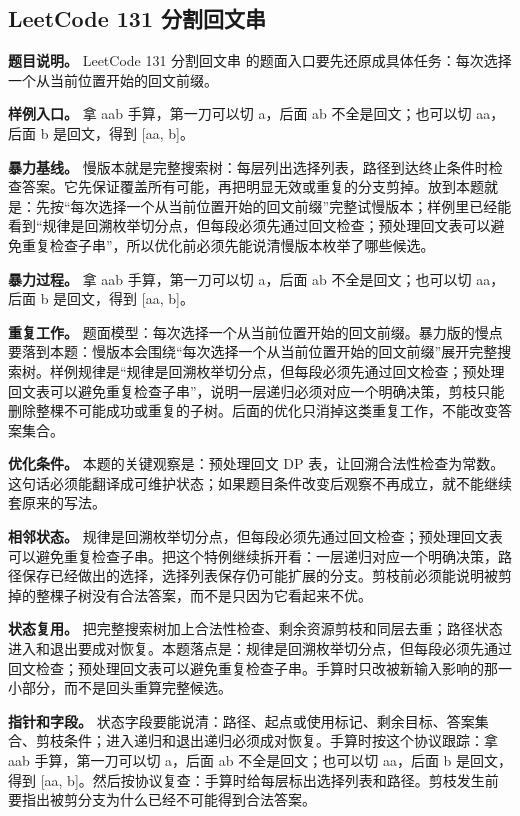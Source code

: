 \subsection{LeetCode 131 分割回文串}

\textbf{题目说明。} LeetCode 131 分割回文串 的题面入口要先还原成具体任务：每次选择一个从当前位置开始的回文前缀。

\textbf{样例入口。} 拿 aab 手算，第一刀可以切 a，后面 ab 不全是回文；也可以切 aa，后面 b 是回文，得到 [aa, b]。

\textbf{暴力基线。} 慢版本就是完整搜索树：每层列出选择列表，路径到达终止条件时检查答案。它先保证覆盖所有可能，再把明显无效或重复的分支剪掉。放到本题就是：先按“每次选择一个从当前位置开始的回文前缀”完整试慢版本；样例里已经能看到“规律是回溯枚举切分点，但每段必须先通过回文检查；预处理回文表可以避免重复检查子串”，所以优化前必须先能说清慢版本枚举了哪些候选。

\textbf{暴力过程。} 拿 aab 手算，第一刀可以切 a，后面 ab 不全是回文；也可以切 aa，后面 b 是回文，得到 [aa, b]。

\textbf{重复工作。} 题面模型：每次选择一个从当前位置开始的回文前缀。暴力版的慢点要落到本题：慢版本会围绕“每次选择一个从当前位置开始的回文前缀”展开完整搜索树。样例规律是“规律是回溯枚举切分点，但每段必须先通过回文检查；预处理回文表可以避免重复检查子串”，说明一层递归必须对应一个明确决策，剪枝只能删除整棵不可能成功或重复的子树。后面的优化只消掉这类重复工作，不能改变答案集合。

\textbf{优化条件。} 本题的关键观察是：预处理回文 DP 表，让回溯合法性检查为常数。这句话必须能翻译成可维护状态；如果题目条件改变后观察不再成立，就不能继续套原来的写法。

\textbf{相邻状态。} 规律是回溯枚举切分点，但每段必须先通过回文检查；预处理回文表可以避免重复检查子串。把这个特例继续拆开看：一层递归对应一个明确决策，路径保存已经做出的选择，选择列表保存仍可能扩展的分支。剪枝前必须能说明被剪掉的整棵子树没有合法答案，而不是只因为它看起来不优。

\textbf{状态复用。} 把完整搜索树加上合法性检查、剩余资源剪枝和同层去重；路径状态进入和退出要成对恢复。本题落点是：规律是回溯枚举切分点，但每段必须先通过回文检查；预处理回文表可以避免重复检查子串。手算时只改被新输入影响的那一小部分，而不是回头重算完整候选。

\textbf{指针和字段。} 状态字段要能说清：路径、起点或使用标记、剩余目标、答案集合、剪枝条件；进入递归和退出递归必须成对恢复。手算时按这个协议跟踪：拿 aab 手算，第一刀可以切 a，后面 ab 不全是回文；也可以切 aa，后面 b 是回文，得到 [aa, b]。然后按协议复查：手算时给每层标出选择列表和路径。剪枝发生前要指出被剪分支为什么已经不可能得到合法答案。

